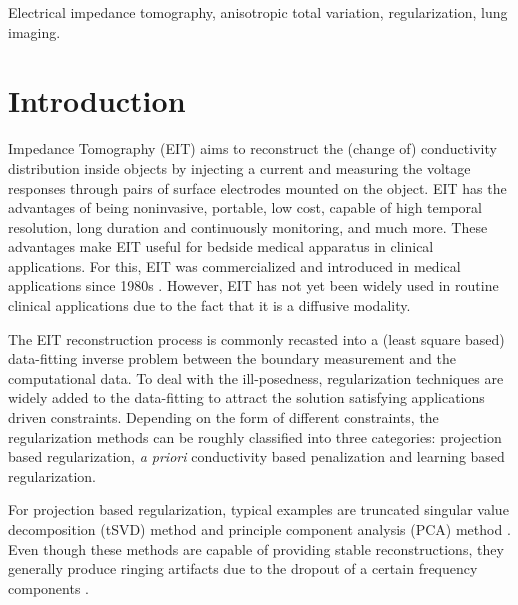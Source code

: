 \documentclass[lettersize,journal]{IEEEtran}
\begin{document}
\begin{IEEEkeywords}
Electrical impedance tomography, anisotropic total variation, regularization, lung imaging.
\end{IEEEkeywords}

\section{Introduction}
\label{sec:introduction}
 Impedance Tomography (EIT) aims to reconstruct the (change of) conductivity distribution inside objects by injecting a current and measuring the voltage responses through pairs of surface electrodes mounted on the object.
EIT has the advantages of being noninvasive, portable, low cost, capable of high temporal resolution, long duration and continuously monitoring, and much more. These advantages make EIT useful for bedside medical apparatus in clinical applications.
For this, EIT was commercialized and introduced in medical applications since 1980s \cite{Barber1984}.
However, EIT has not yet been widely used in routine clinical applications due to the fact that it is a diffusive modality.



The EIT reconstruction process is commonly recasted into a (least square based) data-fitting inverse problem between the boundary measurement and the computational data.
To deal with the ill-posedness, regularization techniques are widely added to the data-fitting to attract the solution satisfying applications driven constraints. Depending on the form of different constraints, the regularization methods can be roughly classified into three categories: projection based regularization, {\it a priori} conductivity based penalization and learning based regularization.

For projection based regularization, typical examples are truncated singular value decomposition (tSVD) method \cite{Hansen1987,Tehrani2012} and principle component analysis (PCA) method \cite{Vauhkonen1998}.
Even though these methods are capable of providing stable reconstructions, they generally produce ringing artifacts due to the dropout of a certain frequency components \cite{Choi2014}.
\end{document}
